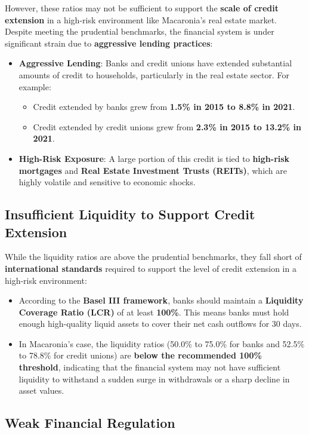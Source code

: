 However, these ratios may not be sufficient to support the \textbf{scale of credit extension} in a high-risk environment like Macaronia's real estate market. Despite meeting the prudential benchmarks, the financial system is under significant strain due to \textbf{aggressive lending practices}:
\begin{itemize}
    \item \textbf{Aggressive Lending}: Banks and credit unions have extended substantial amounts of credit to households, particularly in the real estate sector. For example:
        \begin{itemize}
            \item Credit extended by banks grew from \textbf{1.5\% in 2015 to 8.8\% in 2021}.
            \item Credit extended by credit unions grew from \textbf{2.3\% in 2015 to 13.2\% in 2021}.
        \end{itemize}
    \item \textbf{High-Risk Exposure}: A large portion of this credit is tied to \textbf{high-risk mortgages} and \textbf{Real Estate Investment Trusts (REITs)}, which are highly volatile and sensitive to economic shocks.
\end{itemize}

\subsection*{Insufficient Liquidity to Support Credit Extension}

While the liquidity ratios are above the prudential benchmarks, they fall short of \textbf{international standards} required to support the level of credit extension in a high-risk environment:
\begin{itemize}
    \item According to the \textbf{Basel III framework}, banks should maintain a \textbf{Liquidity Coverage Ratio (LCR)} of at least \textbf{100\%}. This means banks must hold enough high-quality liquid assets to cover their net cash outflows for 30 days.
    \item In Macaronia's case, the liquidity ratios (50.0\% to 75.0\% for banks and 52.5\% to 78.8\% for credit unions) are \textbf{below the recommended 100\% threshold}, indicating that the financial system may not have sufficient liquidity to withstand a sudden surge in withdrawals or a sharp decline in asset values.
\end{itemize}

\subsection*{Weak Financial Regulation}

